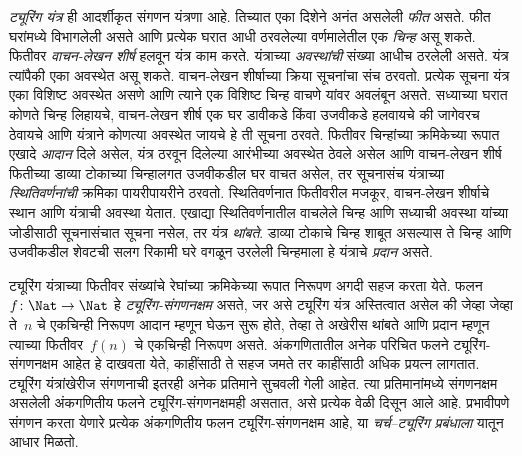 \emph{ट्यूरिंग यंत्र} ही आदर्शीकृत संगणन यंत्रणा आहे. तिच्यात एका दिशेने अनंत असलेली \emph{फीत} असते. फीत घरांमध्ये विभागलेली असते आणि प्रत्येक घरात आधी ठरवलेल्या वर्णमालेतील एक \emph{चिन्ह} असू शकते. फितीवर \emph{वाचन-लेखन शीर्ष} हलवून यंत्र काम करते. यंत्राच्या \emph{अवस्थांची} संख्या आधीच ठरलेली असते. यंत्र त्यांपैकी एका अवस्थेत असू शकते. वाचन-लेखन शीर्षाच्या क्रिया सूचनांचा संच ठरवतो. प्रत्येक सूचना यंत्र एका विशिष्ट अवस्थेत असणे आणि त्याने एक विशिष्ट चिन्ह वाचणे यांवर अवलंबून असते. सध्याच्या घरात कोणते चिन्ह लिहायचे, वाचन-लेखन शीर्ष एक घर डावीकडे किंवा उजवीकडे हलवायचे की जागेवरच ठेवायचे आणि यंत्राने कोणत्या अवस्थेत जायचे हे ती सूचना ठरवते. फितीवर चिन्हांच्या क्रमिकेच्या रूपात एखादे \emph{आदान} दिले असेल, यंत्र ठरवून दिलेल्या आरंभीच्या अवस्थेत ठेवले असेल आणि वाचन-लेखन शीर्ष फितीच्या डाव्या टोकाच्या चिन्हालगत उजवीकडील घर वाचत असेल, तर सूचनासंच यंत्राच्या \emph{स्थितिवर्णनांची} क्रमिका पायरीपायरीने ठरवतो. स्थितिवर्णनात फितीवरील मजकूर, वाचन-लेखन शीर्षाचे स्थान आणि यंत्राची अवस्था येतात. एखाद्या स्थितिवर्णनातील वाचलेले चिन्ह आणि सध्याची अवस्था यांच्या जोडीसाठी सूचनासंचात सूचना नसेल, तर यंत्र \emph{थांबते}. डाव्या टोकाचे चिन्ह शाबूत असल्यास ते चिन्ह आणि उजवीकडील शेवटची सलग रिकामी घरे वगळून उरलेली चिन्हमाला हे यंत्राचे \emph{प्रदान} असते.

ट्यूरिंग यंत्राच्या फितीवर संख्यांचे रेघांच्या क्रमिकेच्या रूपात निरूपण अगदी सहज करता येते. फलन $f\colon\Nat \to \Nat$ हे \emph{ट्यूरिंग-संगणनक्षम} असते, जर असे ट्यूरिंग यंत्र अस्तित्वात असेल की जेव्हा जेव्हा ते~$n$ चे एकचिन्ही निरूपण आदान म्हणून घेऊन सुरू होते, तेव्हा ते अखेरीस थांबते आणि प्रदान म्हणून त्याच्या फितीवर~$f(n)$ चे एकचिन्ही निरूपण असते. अंकगणितातील अनेक परिचित फलने ट्यूरिंग-संगणनक्षम आहेत हे दाखवता येते, काहींसाठी ते सहज जमते तर काहींसाठी अधिक प्रयत्न लागतात. ट्यूरिंग यंत्रांखेरीज संगणनाची इतरही अनेक प्रतिमाने सुचवली गेली आहेत. त्या प्रतिमानांमध्ये संगणनक्षम असलेली अंकगणितीय फलने ट्यूरिंग-संगणनक्षमही असतात, असे प्रत्येक वेळी दिसून आले आहे. प्रभावीपणे संगणन करता येणारे प्रत्येक अंकगणितीय फलन ट्यूरिंग-संगणनक्षम आहे, या \emph{चर्च--ट्यूरिंग प्रबंधाला} यातून आधार मिळतो.

